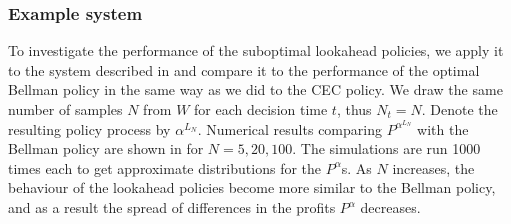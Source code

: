 \documentclass[main.tex]{subfiles}
\begin{document}
\subsubsection{Example system}
To investigate the performance of the suboptimal lookahead
policies, we apply it to the system described in
 and compare it to the performance
of the optimal Bellman policy in the same way as we did to the CEC
policy. We draw the same number of samples $N$ from $W$ for each
decision time $t$, thus $N_t=N$. Denote the resulting policy process
by $\alpha^{L_N}$. Numerical results comparing $P^{\alpha^{L_N}}$ with the
Bellman policy are shown in 
for $N=5,20,100$. The simulations are run 1000 times each to get
approximate distributions for the $P^\alpha$s.
As $N$ increases, the behaviour of the lookahead policies become more
similar to the Bellman policy, and as a result the spread of differences in the
profits $P^\alpha$ decreases.
\end{document}
